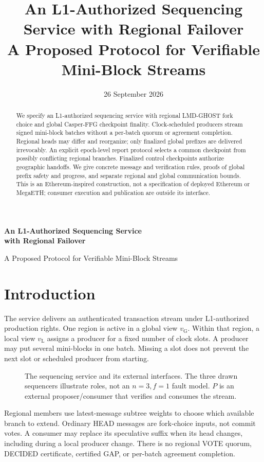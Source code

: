 \documentclass[11pt,a4paper,onecolumn]{article}
\title{An L1-Authorized Sequencing Service with Regional Failover\\
\large A Proposed Protocol for Verifiable Mini-Block Streams}
\author{}\date{26 September 2026}
\newcommand{\gv}{v_{\mathrm G}}
\newcommand{\lv}{v_{\mathrm L}}
\theoremstyle{remark}\newtheorem{example}[definition]{Example}
\newcounter{protocol}
\begin{document}
\begin{center}
{\Large\bfseries An L1-Authorized Sequencing Service\\with Regional Failover\par}
\vspace{.5em}
{\normalsize A Proposed Protocol for Verifiable Mini-Block Streams\par}
\vspace{.4em}{\small 26 September 2026}
\end{center}
\begin{abstract}
We specify an L1-authorized sequencing service with regional LMD-GHOST fork
choice and global Casper-FFG checkpoint finality. Clock-scheduled producers
stream signed mini-block batches without a per-batch quorum or agreement
completion. Regional heads may differ and reorganize; only finalized global
prefixes are delivered irrevocably. An explicit epoch-level report protocol
selects a common checkpoint from possibly conflicting regional branches.
Finalized control checkpoints authorize geographic handoffs. We give concrete
message and verification rules, proofs of global prefix safety and progress,
and separate regional and global communication bounds. This is an
Ethereum-inspired construction, not a specification of deployed Ethereum or
MegaETH; consumer execution and publication are outside its interface.
\end{abstract}

\section{Introduction}\label{sec:intro}
The service delivers an authenticated transaction stream under L1-authorized
production rights. One region is active in a global view $\gv$. Within that
region, a local view $\lv$ assigns a producer for a fixed number of clock slots.
A producer may put several mini-blocks in one batch. Missing a slot does not
prevent the next slot or scheduled producer from starting.

\begin{figure}[H]\centering

\caption{The sequencing service and its external interfaces. The three drawn
sequencers illustrate roles, not an $n=3,f=1$ fault model. $P$ is an external
proposer/consumer that verifies and consumes the stream.}
\label{fig:architecture}
\end{figure}

Regional members use latest-message subtree weights to choose which available
branch to extend. Ordinary HEAD messages are fork-choice inputs, not commit
votes. A consumer may replace its speculative suffix when its head changes,
including during a local producer change. There is no regional VOTE quorum,
DECIDED certificate, certified GAP, or per-batch agreement completion.
\end{document}
